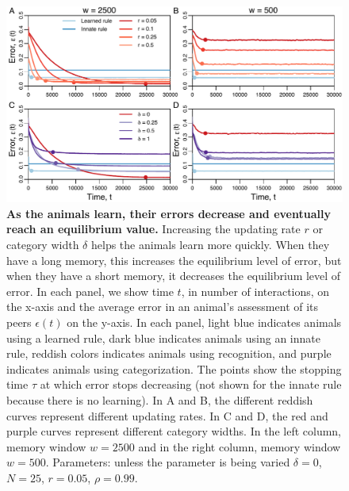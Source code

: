 \begin{figure}
\includegraphics[width=6.85in]{figures/speed_accuracy_tradeoff.pdf}
\caption{\sffamily\small\textbf{As the animals learn, their errors decrease and eventually reach an equilibrium value.} Increasing the updating rate $r$ or category width $\delta$ helps the animals learn more quickly. When they have a long memory, this increases the equilibrium level of error, but when they have a short memory, it decreases the equilibrium level of error. In each panel, we show time $t$, in number of interactions, on the x-axis and the average error in an animal's assessment of its peers $\epsilon(t)$ on the y-axis. In each panel, light blue indicates animals using a learned rule, dark blue indicates animals using an innate rule, reddish colors indicates animals using recognition, and purple indicates animals using categorization. The points show the stopping time $\tau$ at which error stops decreasing (not shown for the innate rule because there is no learning). In A and B, the different reddish curves represent different updating rates. In C and D, the red and purple curves represent different category widths. In the left column, memory window $w=2500$ and in the right column, memory window $w=500$. Parameters: unless the parameter is being varied $\delta=0$, $N=25$, $r=0.05$, $\rho=0.99$.}
\label{tradeoff}
\end{figure}

